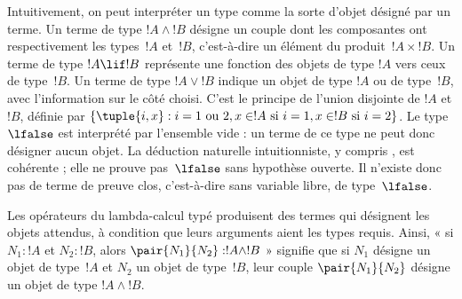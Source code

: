 \documentclass[../../../include/open-logic-section]{subfiles}
\begin{document}
Intuitivement, on peut interpréter un type comme la sorte
d'objet désigné par un terme.
Un terme de type $!A \land !B$ désigne un couple dont
les composantes ont respectivement les types~$!A$ et~$!B$,
c'est-à-dire un élément du produit~$!A \times !B$.
Un terme de type $!A \lif !B$ représente une fonction
des objets de type $!A$ vers ceux de type~$!B$.
Un terme de type $!A \lor !B$ indique un objet de type
$!A$ ou de type~$!B$, avec l'information sur le côté choisi.
C'est le principe de l'union disjointe de $!A$ et $!B$,
définie par $\{\tuple{i,x} : i = 1 \text{ ou } 2,
x \in !A \text{ si } i = 1, x \in !B \text{ si } i=2\}$.
Le type $\lfalse$ est interprété par l'ensemble vide :
un terme de ce type ne peut donc désigner aucun objet.
La déduction naturelle intuitionniste, y compris ,
est cohérente ; elle ne prouve pas~$\lfalse$ sans hypothèse
ouverte. Il n'existe donc pas de terme de preuve clos,
c'est-à-dire sans variable libre, de type~$\lfalse$.

Les opérateurs du lambda-calcul typé produisent des termes
qui désignent les objets attendus, à condition que leurs
arguments aient les types requis.
Ainsi, « si $N_1 : !A$ et $N_2 : !B$, alors
$\pair{N_1}{N_2} : !A \land !B$ » signifie que
si $N_1$ désigne un objet de type~$!A$ et $N_2$ un objet
de type~$!B$, leur couple $\pair{N_1}{N_2}$ désigne
un objet de type $!A \land !B$.
\end{document}
